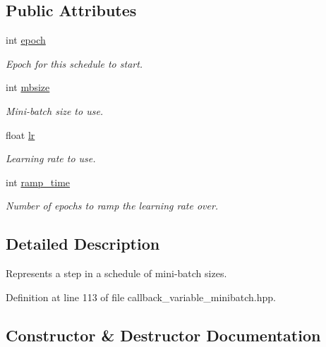 \subsection*{Public Attributes}
\begin{DoxyCompactItemize}
\item 
int \hyperlink{structlbann_1_1lbann__callback__minibatch__schedule_1_1minibatch__step_ac5f8dae80a258168a9650ad55a2965d9}{epoch}
\begin{DoxyCompactList}\small\item\em Epoch for this schedule to start. \end{DoxyCompactList}\item 
int \hyperlink{structlbann_1_1lbann__callback__minibatch__schedule_1_1minibatch__step_a51af7cf1ea3d8b0c7f92812ab71ee921}{mbsize}
\begin{DoxyCompactList}\small\item\em Mini-\/batch size to use. \end{DoxyCompactList}\item 
float \hyperlink{structlbann_1_1lbann__callback__minibatch__schedule_1_1minibatch__step_a708c92504c27e6e26b40877f5c756ce1}{lr}
\begin{DoxyCompactList}\small\item\em Learning rate to use. \end{DoxyCompactList}\item 
int \hyperlink{structlbann_1_1lbann__callback__minibatch__schedule_1_1minibatch__step_aff33b3fadf607df0d942ffa642e0f927}{ramp\+\_\+time}
\begin{DoxyCompactList}\small\item\em Number of epochs to ramp the learning rate over. \end{DoxyCompactList}\end{DoxyCompactItemize}


\subsection{Detailed Description}
Represents a step in a schedule of mini-\/batch sizes. 

Definition at line 113 of file callback\+\_\+variable\+\_\+minibatch.\+hpp.



\subsection{Constructor \& Destructor Documentation}
\mbox{\label{structlbann_1_1lbann__callback__minibatch__schedule_1_1minibatch__step_a76efb978eebc607dd1f7be0e464ac447}} 
